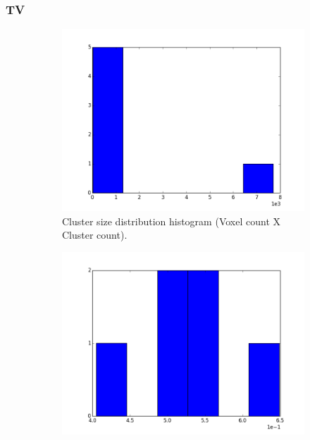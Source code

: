\documentclass[a4paper,11pt]{report}
\begin{document}
    \subsubsection{TV}
    \begin{figure}[!ht]
      \centering

      \begin{subfigure}[t]{.49\textwidth}
        \includegraphics[width=1\linewidth]{img/histograms/tv_clustered_fa_mask_region_sizes_hist.png}
        \caption{Cluster size distribution histogram (Voxel count X Cluster count).}
        \label{subfig:fa_hist_region}
      \end{subfigure}\hfill%
      \begin{subfigure}[t]{.49\textwidth}
        \includegraphics[width=1\linewidth]{img/histograms/tv_clustered_fa_mask_fa_means_hist.png}

\end{subfigure}
\end{figure}
\end{document}
